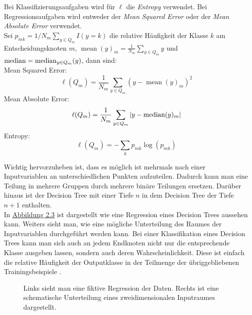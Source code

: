 Bei Klassifizierungsaufgaben wird f\"ur $\ell$ die \textit{Entropy} verwendet. Bei Regressionsaufgaben wird entweder der \textit{Mean Squared Error} oder 
der \textit{Mean Absolute Error} verwendet. \\

Sei $p_{mk} = 1/N_m \sum_{y \in Q_m} I(y = k)$ 
die relative H\"aufigkeit der Klasse $k$ am Entscheidungsknoten $m$, $\operatorname{mean}(y)_m = \frac{1}{N_m}\sum_{y\in Q_m}y$ und $ \operatorname*{median} = \operatorname*{median}_{y \in Q_m}(y)$, dann sind: \\


Mean Squared Error:  $$ \ell(Q_m) = \frac{1}{N_m} \sum_{y\in Q_m} (y - \operatorname{mean}(y)_m)^2 $$
Mean Absolute Error: $$ \ell(Q_m) = \frac{1}{N_m} \sum_{y\in Q_m} |y - \operatorname*{median}(y)_m| $$
Entropy: $$ \ell(Q_m) = - \sum_{k} p_{mk}\log(p_{mk}) $$


Wichtig hervorzuheben ist, dass es m\"oglich ist mehrmals nach einer Inputvariablen an unterschiedlichen Punkten aufzuteilen. 
Dadurch kann man eine Teilung in mehrere Gruppen durch mehrere bin\"are Teilungen ersetzen.
Dar\"uber hinaus ist der Decision Tree mit einer Tiefe $n$ in dem Decision Tree der Tiefe $n + 1$ enthalten. \\



In \hyperref[fig:rf2]{Abbildung 2.3} ist dargestellt wie eine Regression eines Decision Trees aussehen kann. Weiters sieht man, wie eine m\"ogliche Unterteilung des 
Raumes der Inputvariablen durchgef\"uhrt werden kann. Bei einer Klassifikation eines Decision Trees kann man sich auch an jedem Endknoten nicht nur die entsprechende Klasse 
ausgeben lassen, sondern auch deren Wahrscheinlichkeit. Diese ist einfach die relative H\"aufigkeit der Outputklasse in der Teilmenge der \"ubriggebliebenen Trainingsbeispiele \cite{sklearn}.  \\ 

\begin{figure}[ht]
  \label{fig:rf2}
  \begin{center}
    \begin{tiny}
    \end{tiny}
  \end{center}
  \caption[Regression eines Random Forest Modells]
    {Links sieht man eine fiktive Regression der Daten. Rechts ist eine schematische Unterteilung eines zweidimensionalen Inputraumes dargestellt.}
\end{figure}





























